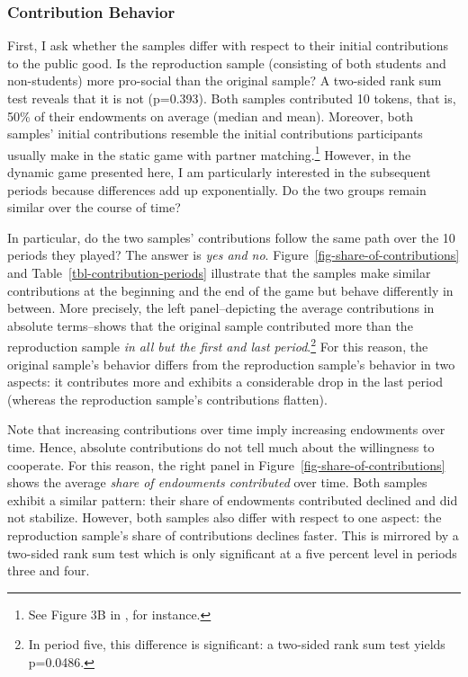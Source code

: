 \documentclass[
  authoryear,
  review,
  3p,
  onecolumn]{elsarticle}
\begin{document}
\hypertarget{sec-contributions}{%
\subsubsection{Contribution Behavior}\label{sec-contributions}}

First, I ask whether the samples differ with respect to their initial
contributions to the public good. Is the reproduction sample (consisting
of both students and non-students) more pro-social than the original
sample? A two-sided rank sum test reveals that it is not (p=0.393). Both
samples contributed 10 tokens, that is, 50\% of their endowments on
average (median and mean). Moreover, both samples' initial contributions
resemble the initial contributions participants usually make in the
static game with partner matching.\footnote{See Figure 3B in
  \citet[p.989]{fehrgaechter2000}, for instance.} However, in the
dynamic game presented here, I am particularly interested in the
subsequent periods because differences add up exponentially. Do the two
groups remain similar over the course of time?

In particular, do the two samples' contributions follow the same path
over the 10 periods they played? The answer is \emph{yes and no}.
Figure~\ref{fig-share-of-contributions} and
Table~\ref{tbl-contribution-periods} illustrate that the samples make
similar contributions at the beginning and the end of the game but
behave differently in between. More precisely, the left panel--depicting
the average contributions in absolute terms--shows that the original
sample contributed more than the reproduction sample \emph{in all but
the first and last period}.\footnote{In period five, this difference is
  significant: a two-sided rank sum test yields p=0.0486.} For this
reason, the original sample's behavior differs from the reproduction
sample's behavior in two aspects: it contributes more and exhibits a
considerable drop in the last period (whereas the reproduction sample's
contributions flatten).

Note that increasing contributions over time imply increasing endowments
over time. Hence, absolute contributions do not tell much about the
willingness to cooperate. For this reason, the right panel in
Figure~\ref{fig-share-of-contributions} shows the average \emph{share of
endowments contributed} over time. Both samples exhibit a similar
pattern: their share of endowments contributed declined and did not
stabilize. However, both samples also differ with respect to one aspect:
the reproduction sample's share of contributions declines faster. This
is mirrored by a two-sided rank sum test which is only significant at a
five percent level in periods three and four.
\end{document}
